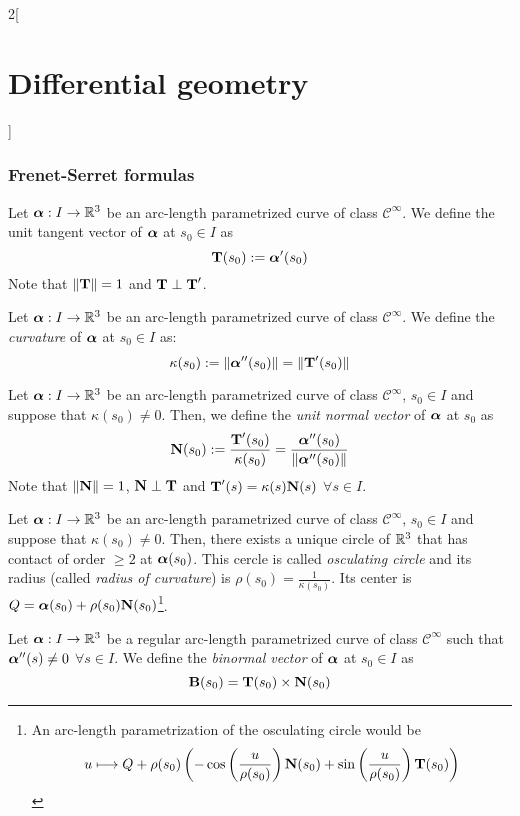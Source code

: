 \documentclass[../../../main.tex]{subfiles}
\begin{document}
\begin{multicols}{2}[\section{Differential geometry}]
  \subsubsection{Frenet-Serret formulas}
  \begin{definition}
    Let $\boldsymbol{\mathrm{\alpha}}:I\rightarrow\mathbb{R}^3$ be an arc-length parametrized curve of class $\mathcal{C}^\infty$. We define the unit tangent vector of $\boldsymbol{\mathrm{\alpha}}$ at $s_0\in I$ as $$\boldsymbol{\mathrm{T}}(s_0):=\boldsymbol{\mathrm{\alpha}}'(s_0)$$ Note that $\|\boldsymbol{\mathrm{T}}\|=1$ and $\boldsymbol{\mathrm{T}}\perp\boldsymbol{\mathrm{T}}'$.
  \end{definition}
  \begin{definition}
    Let $\boldsymbol{\mathrm{\alpha}}:I\rightarrow\mathbb{R}^3$ be an arc-length parametrized curve of class $\mathcal{C}^\infty$. We define the \emph{curvature} of $\boldsymbol{\mathrm{\alpha}}$ at $s_0\in I$ as: $$\kappa(s_0):=\|\boldsymbol{\mathrm{\alpha}}''(s_0)\|=\|\boldsymbol{\mathrm{T}}'(s_0)\|$$
  \end{definition}
  \begin{definition}
    Let $\boldsymbol{\mathrm{\alpha}}:I\rightarrow\mathbb{R}^3$ be an arc-length parametrized curve of class $\mathcal{C}^\infty$, $s_0\in I$ and suppose that $\kappa(s_0)\ne 0$. Then, we define the \emph{unit normal vector} of $\boldsymbol{\mathrm{\alpha}}$ at $s_0$ as $$\boldsymbol{\mathrm{N}}(s_0):=\frac{\boldsymbol{\mathrm{T}}'(s_0)}{\kappa(s_0)}=\frac{\boldsymbol{\mathrm{\alpha}}''(s_0)}{\|\boldsymbol{\mathrm{\alpha}}''(s_0)\|}$$
    Note that $\|\boldsymbol{\mathrm{N}}\|=1$, $\boldsymbol{\mathrm{N}}\perp\boldsymbol{\mathrm{T}}$ and $\boldsymbol{\mathrm{T}}'(s)=\kappa(s)\boldsymbol{\mathrm{N}}(s)$ $\forall s\in I$.
  \end{definition}
  \begin{prop}
    Let $\boldsymbol{\mathrm{\alpha}}:I\rightarrow\mathbb{R}^3$ be an arc-length parametrized curve of class $\mathcal{C}^\infty$, $s_0\in I$ and suppose that $\kappa(s_0)\ne 0$. Then, there exists a unique circle of $\mathbb{R}^3$ that has contact of order $\geq 2$ at $\boldsymbol{\mathrm{\alpha}}(s_0)$. This cercle is called \emph{osculating circle} and its radius (called \emph{radius of curvature}) is $\rho(s_0)=\frac{1}{\kappa(s_0)}$. Its center is $Q=\boldsymbol{\mathrm{\alpha}}(s_0)+\rho(s_0)\boldsymbol{\mathrm{N}}(s_0)$\footnote{An arc-length parametrization of the osculating circle would be $$u\longmapsto Q+\rho(s_0)\left(-\cos\left(\frac{u}{\rho(s_0)}\right)\boldsymbol{\mathrm{N}}(s_0)+\sin\left(\frac{u}{\rho(s_0)}\right)\boldsymbol{\mathrm{T}}(s_0)\right)$$}.
  \end{prop}
  \begin{definition}
    Let $\boldsymbol{\mathrm{\alpha}}:I\rightarrow\mathbb{R}^3$ be a regular arc-length parametrized curve of class $\mathcal{C}^\infty$ such that $\boldsymbol{\mathrm{\alpha}}''(s)\ne 0$ $\forall s\in I$. We define the \emph{binormal vector} of $\boldsymbol{\mathrm{\alpha}}$ at $s_0\in I$ as $$\boldsymbol{\mathrm{B}}(s_0)=\boldsymbol{\mathrm{T}}(s_0)\times\boldsymbol{\mathrm{N}}(s_0)$$

\end{definition}
\end{multicols}
\end{document}
